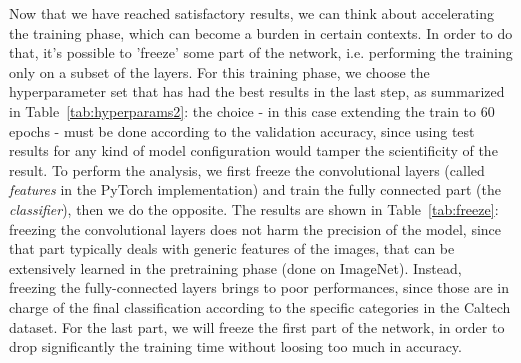 \documentclass[11pt,twoside,a4paper]{article}
\begin{document}
Now that we have reached satisfactory results, we can think about accelerating the training phase, which can become a burden in certain contexts. In order to do that, it's possible to 'freeze' some part of the network, i.e. performing the training only on a subset of the layers. For this training phase, we choose the hyperparameter set that has had the best results in the last step, as summarized in Table~\ref{tab:hyperparams2}: the choice - in this case extending the train to 60 epochs - must be done according to the validation accuracy, since using test results for any kind of model configuration would tamper the scientificity of the result. To perform the analysis, we first freeze the convolutional layers (called \textit{features} in the PyTorch implementation) and train the fully connected part (the \textit{classifier}), then we do the opposite.\newline
The results are shown in Table~\ref{tab:freeze}: freezing the convolutional layers does not harm the precision of the model, since that part typically deals with generic features of the images, that can be extensively learned in the pretraining phase (done on ImageNet). Instead, freezing the fully-connected layers brings to poor performances, since those are in charge of the final classification according to the specific categories in the Caltech dataset. For the last part, we will freeze the first part of the network, in order to drop significantly the training time without loosing too much in accuracy.
\end{document}
